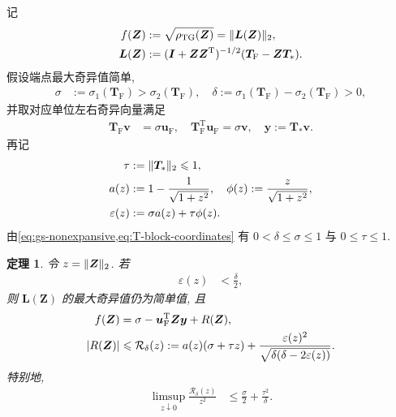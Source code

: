 \documentclass{ctexart}
\newcommand{\q}{\quad}
\newcommand{\T}{\mathrm{T}}
\newcommand{\dt}{\delta}
\renewcommand{\le}{\leqslant}
\DeclarePairedDelimiter\norm{\lVert}{\rVert}
\DeclarePairedDelimiter\abs{\lvert}{\rvert}
\newtheorem{theorem}{定理}[section]
\begin{document}
记
\begin{align}
    f(\bm Z)&:=\sqrt{\rho_{\mathrm{TG}}(\bm Z)}=\norm{\bm L(\bm Z)}_2,
    \label{eq:local-f-definition}\\
    \bm L(\bm Z)&:=(\bm I+\bm Z\bm Z^\T)^{-1/2}(\bm T_{\mathrm F}-\bm Z\bm T_\ast).
    \label{eq:local-L-definition}
\end{align}
假设端点最大奇异值简单,
\begin{align}
    \sigma&:=\sigma_1(\bm T_{\mathrm F})>\sigma_2(\bm T_{\mathrm F}),\q
    \dt:=\sigma_1(\bm T_{\mathrm F})-\sigma_2(\bm T_{\mathrm F})>0,
    \label{eq:endpoint-singular-gap}
\end{align}
并取对应单位左右奇异向量满足
\begin{align}
    \bm T_{\mathrm F}\bm v&=\sigma\bm u_{\mathrm F},\q
    \bm T_{\mathrm F}^\T\bm u_{\mathrm F}=\sigma\bm v,\q
    \bm y:=\bm T_\ast\bm v.
    \label{eq:endpoint-singular-vectors}
\end{align}
再记
\begin{align}
    \tau&:=\norm{\bm T_\ast}_2\le1,
    \label{eq:Tstar-norm-tau}\\
    a(z)&:=1-\frac1{\sqrt{1+z^2}},\q
    \phi(z):=\frac{z}{\sqrt{1+z^2}},
    \label{eq:local-a-phi}\\
    \varepsilon(z)&:=\sigma a(z)+\tau\phi(z).
    \label{eq:local-epsilon}
\end{align}
由\cref{eq:gs-nonexpansive,eq:T-block-coordinates} 有 $0<\dt\le\sigma\le1$ 与 $0\le\tau\le1$.

\begin{theorem}
\label{thm:endpoint-local-expansion}
令 $z=\norm{\bm Z}_2$. 若
\begin{align}
    \varepsilon(z)&<\frac{\dt}{2},
    \label{eq:local-sharp-domain}
\end{align}
则 $\bm L(\bm Z)$ 的最大奇异值仍为简单值, 且
\begin{align}
    f(\bm Z)&=\sigma-\bm u_{\mathrm F}^\T\bm Z\bm y+R(\bm Z),
    \label{eq:local-expansion}\\
    \abs{R(\bm Z)}
    &\le \mathcal R_\dt(z)
    :=a(z)(\sigma+\tau z)
      +\frac{\varepsilon(z)^2}
      {\sqrt{\dt(\dt-2\varepsilon(z))}}.
    \label{eq:local-remainder-bound}
\end{align}
特别地,
\begin{align}
    \limsup_{z\downarrow0}\frac{\mathcal R_\dt(z)}{z^2}
    &\le\frac{\sigma}{2}+\frac{\tau^2}{\dt}.
    \label{eq:local-remainder-asymptotic}
\end{align}
\end{theorem}
\end{document}
